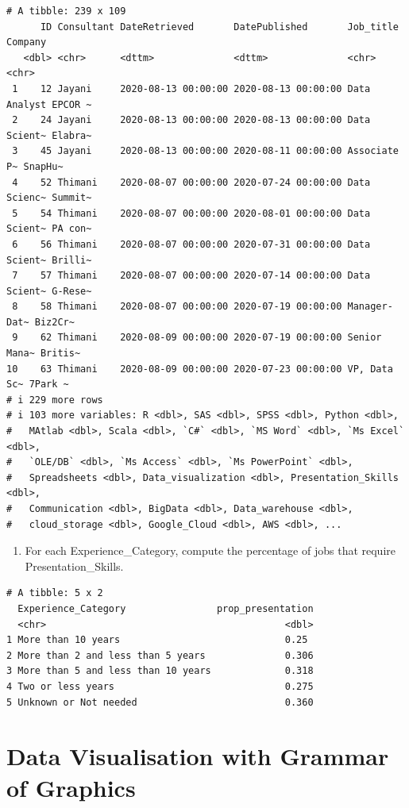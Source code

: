 \documentclass[
  letterpaper,
  DIV=11,
  numbers=noendperiod]{scrreprt}
\providecommand{\tightlist}{%
  \setlength{\itemsep}{0pt}\setlength{\parskip}{0pt}}\usepackage{longtable,booktabs,array}
\begin{document}
\begin{verbatim}
# A tibble: 239 x 109
      ID Consultant DateRetrieved       DatePublished       Job_title    Company
   <dbl> <chr>      <dttm>              <dttm>              <chr>        <chr>  
 1    12 Jayani     2020-08-13 00:00:00 2020-08-13 00:00:00 Data Analyst EPCOR ~
 2    24 Jayani     2020-08-13 00:00:00 2020-08-13 00:00:00 Data Scient~ Elabra~
 3    45 Jayani     2020-08-13 00:00:00 2020-08-11 00:00:00 Associate P~ SnapHu~
 4    52 Thimani    2020-08-07 00:00:00 2020-07-24 00:00:00 Data Scienc~ Summit~
 5    54 Thimani    2020-08-07 00:00:00 2020-08-01 00:00:00 Data Scient~ PA con~
 6    56 Thimani    2020-08-07 00:00:00 2020-07-31 00:00:00 Data Scient~ Brilli~
 7    57 Thimani    2020-08-07 00:00:00 2020-07-14 00:00:00 Data Scient~ G-Rese~
 8    58 Thimani    2020-08-07 00:00:00 2020-07-19 00:00:00 Manager-Dat~ Biz2Cr~
 9    62 Thimani    2020-08-09 00:00:00 2020-07-19 00:00:00 Senior Mana~ Britis~
10    63 Thimani    2020-08-09 00:00:00 2020-07-23 00:00:00 VP, Data Sc~ 7Park ~
# i 229 more rows
# i 103 more variables: R <dbl>, SAS <dbl>, SPSS <dbl>, Python <dbl>,
#   MAtlab <dbl>, Scala <dbl>, `C#` <dbl>, `MS Word` <dbl>, `Ms Excel` <dbl>,
#   `OLE/DB` <dbl>, `Ms Access` <dbl>, `Ms PowerPoint` <dbl>,
#   Spreadsheets <dbl>, Data_visualization <dbl>, Presentation_Skills <dbl>,
#   Communication <dbl>, BigData <dbl>, Data_warehouse <dbl>,
#   cloud_storage <dbl>, Google_Cloud <dbl>, AWS <dbl>, ...
\end{verbatim}

\begin{enumerate}
\def\labelenumi{\arabic{enumi}.}
\setcounter{enumi}{11}
\tightlist
\item
  For each Experience\_Category, compute the percentage of jobs that
  require Presentation\_Skills.
\end{enumerate}

\begin{verbatim}
# A tibble: 5 x 2
  Experience_Category                prop_presentation
  <chr>                                          <dbl>
1 More than 10 years                             0.25 
2 More than 2 and less than 5 years              0.306
3 More than 5 and less than 10 years             0.318
4 Two or less years                              0.275
5 Unknown or Not needed                          0.360
\end{verbatim}


\chapter{Data Visualisation with Grammar of
Graphics}\label{data-visualisation-with-grammar-of-graphics}
\end{document}

